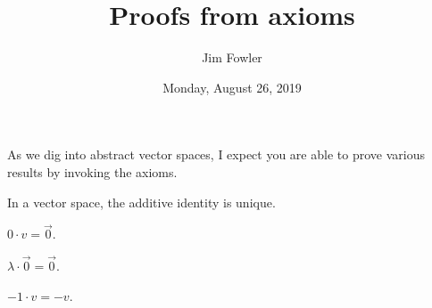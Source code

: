 \documentclass{homework}
\author{Jim Fowler}
\title{Proofs from axioms}
\date{Monday, August 26, 2019}
\begin{document}
\maketitle

As we dig into abstract vector spaces, I expect you are able to prove
various results by invoking the axioms.

\begin{problem}
  In a vector space, the additive identity is unique.
\end{problem}

\vfill

\begin{problem}
  $0 \cdot v = \vec{0}$.
\end{problem}

\vfill

\begin{problem}
  $\lambda \cdot \vec{0} = \vec{0}$.
\end{problem}

\vfill

\begin{problem}
  $-1 \cdot v = -v$.
\end{problem}

\vfill



\end{document}
